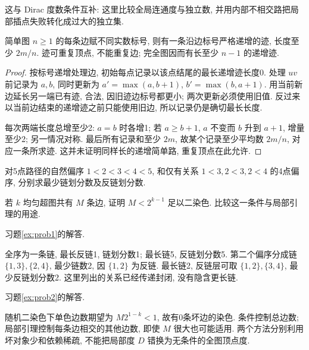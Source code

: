 这与 Dirac 度数条件互补: 这里比较全局连通度与独立数, 并用内部不相交路把局部插点失败转化成过大的独立集.
\begin{proposition}\label{prop:increasingtrail}
简单图 $n\ge1$ 的每条边赋不同实数标号, 则有一条沿边标号严格递增的迹, 长度至少 $2m/n$. 迹可重复顶点, 不能重复边; 完全图因而有长至少 $n-1$ 的递增迹.
\end{proposition}
\begin{proof}
按标号递增处理边, 初始每点记录以该点结尾的最长递增迹长度0. 处理 $uv$ 前记录为 $a,b$, 同时更新为 $a'=\max(a,b+1)$, $b'=\max(b,a+1)$. 用当前新边延长另一端已有迹, 合法, 因旧迹边标号都更小; 两次更新必须使用旧值. 反过来以当前边结束的递增迹之前只能使用旧边, 所以记录仍是确切最长长度.

每次两端长度总增至少2: $a=b$ 时各增1; 若 $a\ge b+1$, $a$ 不变而 $b$ 升到 $a+1$, 增量至少2; 另一情况对称. 最后所有记录和至少 $2m$, 故某个记录至少平均数 $2m/n$, 对应一条所求迹. 这并未证明同样长的递增简单路, 重复顶点在此允许.
\end{proof}
\begin{exercise}\label{ex:prob1}
对5点路径的自然偏序 $1<2<3<4<5$, 和仅有关系 $1<3,2<3,2<4$ 的4点偏序, 分别求最少链划分数及反链划分数.
\end{exercise}
\begin{exercise}\label{ex:prob2}
若 $k$ 均匀超图共有 $M$ 条边, 证明 $M<2^{k-1}$ 足以二染色. 比较这一条件与局部引理的用途.
\end{exercise}
习题\ref{ex:prob1}的解答.
\begin{solution}
全序为一条链, 最长反链1, 链划分数1; 最长链5, 反链划分数5. 第二个偏序分成链 $\{1,3\},\{2,4\}$, 最少链数2, 因 $\{1,2\}$ 为反链. 最长链2, 反链层可取 $\{1,2\},\{3,4\}$, 最少反链划分数2. 这里列出的关系已经传递封闭, 没有隐含更长链.
\end{solution}
习题\ref{ex:prob2}的解答.
\begin{solution}
随机二染色下单色边数期望为 $M2^{1-k}<1$, 故有0条坏边的染色. 条件控制总边数; 局部引理控制每条边相交的其他边数, 即使 $M$ 很大也可能适用. 两个方法分别利用坏对象少和依赖稀疏, 不能把局部度 $D$ 错换为无条件的全图顶点度.
\end{solution}

